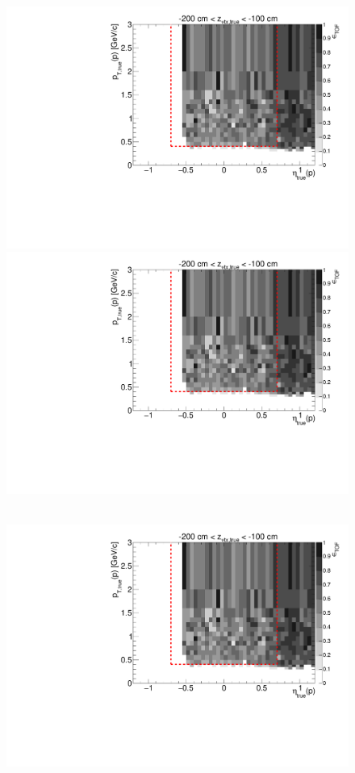\begin{figure}[hb]
{  \includegraphics[width=\linewidth,page=7]{graphics/eff/Eff2D_TOF_proton_Plus.pdf}\\
  \includegraphics[width=\linewidth,page=9]{graphics/eff/Eff2D_TOF_proton_Plus.pdf}
}~
\parbox{0.495\textwidth}{
  \centering
  \includegraphics[width=\linewidth,page=4]{graphics/eff/Eff2D_TOF_proton_Plus.pdf}\\
}
\end{figure}
